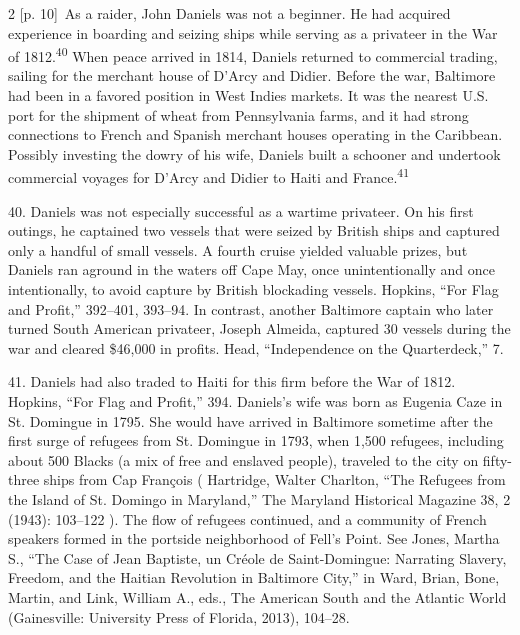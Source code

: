 \documentclass[10pt,a4paper]{article}
\begin{document}
\begin{paracol}{2}
{\scriptsize\color{gray} [p. 10]}\ As a raider, John Daniels was not a beginner. He had acquired experience in boarding and seizing ships while serving as a privateer in the War of 1812.\nobreak\textsuperscript{40} When peace arrived in 1814, Daniels returned to commercial trading, sailing for the merchant house of D’Arcy and Didier. Before the war, Baltimore had been in a favored position in West Indies markets. It was the nearest U.S. port for the shipment of wheat from Pennsylvania farms, and it had strong connections to French and Spanish merchant houses operating in the Caribbean. Possibly investing the dowry of his wife, Daniels built a schooner and undertook commercial voyages for D’Arcy and Didier to Haiti and France.\nobreak\textsuperscript{41}\par{\small 40. Daniels was not especially successful as a wartime privateer. On his first outings, he captained two vessels that were seized by British ships and captured only a handful of small vessels. A fourth cruise yielded valuable prizes, but Daniels ran aground in the waters off Cape May, once unintentionally and once intentionally, to avoid capture by British blockading vessels. Hopkins, “For Flag and Profit,” 392–401, 393–94. In contrast, another Baltimore captain who later turned South American privateer, Joseph Almeida, captured 30 vessels during the war and cleared \$46,000 in profits. Head, “Independence on the Quarterdeck,” 7.\par}{\small 41. Daniels had also traded to Haiti for this firm before the War of 1812. Hopkins, “For Flag and Profit,” 394. Daniels’s wife was born as Eugenia Caze in St. Domingue in 1795. She would have arrived in Baltimore sometime after the first surge of refugees from St. Domingue in 1793, when 1,500 refugees, including about 500 Blacks (a mix of free and enslaved people), traveled to the city on fifty-three ships from Cap François ( Hartridge, Walter Charlton, “The Refugees from the Island of St. Domingo in Maryland,” The Maryland Historical Magazine 38, 2 (1943): 103–122 ). The flow of refugees continued, and a community of French speakers formed in the portside neighborhood of Fell’s Point. See Jones, Martha S., “The Case of Jean Baptiste, un Créole de Saint-Domingue: Narrating Slavery, Freedom, and the Haitian Revolution in Baltimore City,” in Ward, Brian, Bone, Martin, and Link, William A., eds., The American South and the Atlantic World (Gainesville: University Press of Florida, 2013), 104–28.\par}
\switchcolumn*

\end{paracol}
\end{document}
